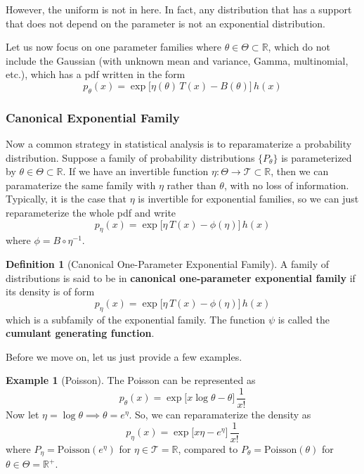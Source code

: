 \documentclass{article}
\theoremstyle{definition}
\newtheorem{example}{Example}[section]
\theoremstyle{remark}
\theoremstyle{definition}
\newtheorem{definition}{Definition}[section]
\begin{document}
However, the uniform is not in here. In fact, any distribution that has a support that does not depend on the parameter is not an exponential distribution. 

Let us now focus on one parameter families where $\theta \in \Theta \subset \mathbb{R}$, which do not include the Gaussian (with unknown mean and variance, Gamma, multinomial, etc.), which has a pdf written in the form 
\[p_\theta (x) = \exp \big[ \eta (\theta) \, T(x) - B(\theta) \big] \, h(x)\]


\subsubsection{Canonical Exponential Family}

Now a common strategy in statistical analysis is to reparamaterize a probability distribution. Suppose a family of probability distributions $\{P_\theta\}$ is parameterized by $\theta \in \Theta \subset \mathbb{R}$. If we have an invertible function $\eta: \Theta \rightarrow \mathcal{T} \subset \mathbb{R}$, then we can paramaterize the same family with $\eta$ rather than $\theta$, with no loss of information. Typically, it is the case that $\eta$ is invertible for exponential families, so we can just reparameterize the whole pdf and write 
\[p_\eta (x) = \exp \big[ \eta \, T(x) - \phi(\eta) \big] \, h(x)\]
where $\phi = B \circ \eta^{-1}$. 

\begin{definition}[Canonical One-Parameter Exponential Family]
A family of distributions is said to be in \textbf{canonical one-parameter exponential family} if its density is of form 
\[p_\eta (x) = \exp \big[ \eta \, T(x) - \phi(\eta) \big] \, h(x)\]
which is a subfamily of the exponential family. The function $\psi$ is called the \textbf{cumulant generating function}. 
\end{definition}

Before we move on, let us just provide a few examples. 

\begin{example}[Poisson]
The Poisson can be represented as 
\[p_\theta (x) = \exp \big[ x \log{\theta} - \theta \big] \, \frac{1}{x!}\]
Now let $\eta = \log{\theta} \implies \theta = e^{\eta}$. So, we can reparamaterize the density as 
\[p_\eta(x) = \exp \big[ x \eta - e^\eta \big] \, \frac{1}{x!}\]
where $P_\eta = \mathrm{Poisson}(e^\eta)$ for $\eta \in \mathcal{T} = \mathbb{R}$, compared to $P_\theta = \mathrm{Poisson}(\theta)$ for $\theta \in \Theta = \mathbb{R}^+$. 
\end{example}
\end{document}

